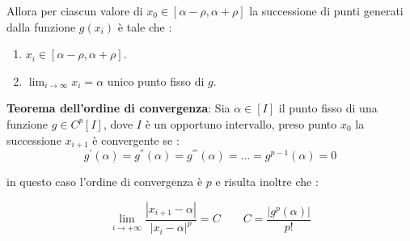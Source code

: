 \documentclass[12pt, a4paper]{book}
\theoremstyle{definition}
\begin{document}
\begin{flushleft}
Allora per ciascun valore di $x_{0} \in [\alpha - \rho,\alpha + \rho]$ la successione di punti generati dalla funzione $g(x_{i})$ è tale che :
\begin{enumerate}
	\item $x_{i} \in [\alpha - \rho,\alpha + \rho]$.
	\item $\lim_{i \rightarrow \infty} x_{i} = \alpha $ unico punto fisso di $g$.
\end{enumerate} 
\vspace{1em}
\textbf{Teorema dell'ordine di convergenza}:
Sia $\alpha \in [I]$ il punto fisso di una funzione $g \in C^{p}[I]$, dove $I$ è un opportuno intervallo,  preso punto $x_{0}$ la successione $x_{i+1}$ è convergente se :
\[	
	g^{'}(\alpha) = g^{''}(\alpha) = g^{'''}(\alpha) = \dots = g^{p-1}(\alpha) = 0 
\]

in questo caso l'ordine di convergenza è $p$ e risulta inoltre che :

\[ 	
	\lim_{i \rightarrow +\infty} \dfrac{|x_{i+1} - \alpha|}{|x_{i} - \alpha|^{p}} = C  \quad \quad C = \dfrac{|g^{p}(\alpha)|}{p!}
\]
\end{flushleft}
\end{document}

